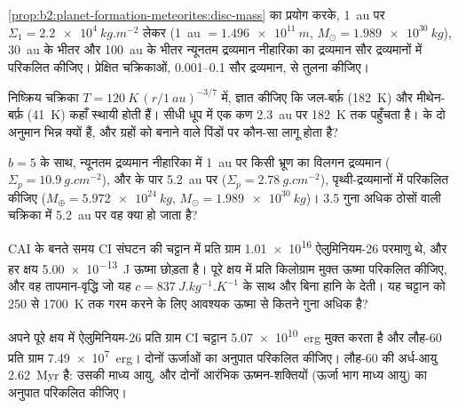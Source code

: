 \begin{exercise}[$\star\star$]\label{exo:b2:planet-formation-meteorites:5}
\cref{prop:b2:planet-formation-meteorites:disc-mass} का प्रयोग करके,
\qty{1}{au} पर $\Sigma_1 = \qty{2.2e4}{kg.m^{-2}}$ लेकर (\qty{1}{au} $=
\qty{1.496e11}{m}$, $M_\odot = \qty{1.989e30}{kg}$), \qty{30}{au} के भीतर और \qty{100}{au} के भीतर
न्यूनतम द्रव्यमान नीहारिका का द्रव्यमान सौर द्रव्यमानों में परिकलित कीजिए।
प्रेक्षित चक्रिकाओं, \numrange{0.001}{0.1} सौर द्रव्यमान, से तुलना कीजिए।
\end{exercise}

\begin{exercise}[$\star\star$]\label{exo:b2:planet-formation-meteorites:6}
निष्क्रिय चक्रिका $T = \qty{120}{K}\,(r/\qty{1}{au})^{-3/7}$ में, ज्ञात कीजिए कि जल-बर्फ़
(\qty{182}{K}) और मीथेन-बर्फ़ (\qty{41}{K}) कहाँ स्थायी होती हैं। सीधी
धूप में एक कण \qty{2.3}{au} पर \qty{182}{K} तक पहुँचता है।  के दो अनुमान
भिन्न क्यों हैं, और ग्रहों को बनाने वाले पिंडों पर कौन-सा लागू होता है?
\end{exercise}

\begin{exercise}[$\star\star$]\label{exo:b2:planet-formation-meteorites:7}
$b = 5$ के साथ, न्यूनतम द्रव्यमान नीहारिका में \qty{1}{au} पर किसी भ्रूण का विलगन द्रव्यमान
($\Sigma_p = \qty{10.9}{g.cm^{-2}}$), और  के पार \qty{5.2}{au} पर
($\Sigma_p = \qty{2.78}{g.cm^{-2}}$), पृथ्वी-द्रव्यमानों में परिकलित कीजिए
($M_\oplus = \qty{5.972e24}{kg}$, $M_\odot = \qty{1.989e30}{kg}$)। \num{3.5} गुना अधिक
ठोसों वाली चक्रिका में \qty{5.2}{au} पर वह क्या हो जाता है?
\end{exercise}

\begin{exercise}[$\star\star$]\label{exo:b2:planet-formation-meteorites:8}
CAI के बनते समय CI संघटन की चट्टान में प्रति ग्राम \num{1.01e16} ऐलुमिनियम-26 परमाणु
थे, और हर क्षय \qty{5.00e-13}{J} ऊष्मा छोड़ता है। पूरे क्षय में
प्रति किलोग्राम मुक्त ऊष्मा परिकलित कीजिए, और वह तापमान-वृद्धि जो यह
$c = \qty{837}{J.kg^{-1}.K^{-1}}$ के साथ और बिना हानि के देती। यह चट्टान को \num{250} से
\qty{1700}{K} तक गरम करने के लिए आवश्यक ऊष्मा से कितने गुना
अधिक है?
\end{exercise}

\begin{exercise}[$\star\star$]\label{exo:b2:planet-formation-meteorites:9}
अपने पूरे क्षय में ऐलुमिनियम-26 प्रति ग्राम CI चट्टान \qty{5.07e10}{erg} मुक्त करता है
और लौह-60 प्रति ग्राम \qty{7.49e7}{erg}। दोनों
ऊर्जाओं का अनुपात परिकलित कीजिए। लौह-60 की अर्ध-आयु \qty{2.62}{Myr} है: उसकी माध्य आयु,
और दोनों आरंभिक ऊष्मन-शक्तियों (ऊर्जा भाग माध्य आयु) का अनुपात परिकलित कीजिए।
\end{exercise}

